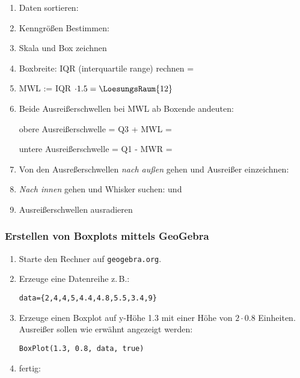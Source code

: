 \begin{enumerate}

\item Daten sortieren: 

\item Kenngrößen Bestimmen: 

\item Skala und Box zeichnen

\item Boxbreite: IQR (interquartile range) rechnen =
\item MWL := IQR $\cdot{} 1.5 = \LoesungsRaum{12}$
  
\item Beide Ausreißerschwellen bei MWL ab Boxende andeuten:

  obere Ausreißerschwelle = Q3 + MWL = 

  untere Ausreißerschwelle = Q1 - MWR = 

  \item Von den Ausreßerschwellen \textit{nach außen} gehen und
    Ausreißer einzeichnen: 

  \item \textit{Nach innen} gehen und Whisker suchen:
     und 
    
  \item Ausreißerschwellen ausradieren
\end{enumerate}





\subsubsection{Erstellen von Boxplots mittels GeoGebra}
\begin{enumerate}
\item Starte den Rechner auf \texttt{geogebra.org}.
\item Erzeuge eine Datenreihe z.\,B.:

\texttt{data=\{2,4,4,5,4.4,4.8,5.5,3.4,9\}}


\item Erzeuge einen Boxplot auf y-Höhe 1.3 mit einer Höhe von
  $2\cdot{}0.8$ Einheiten. Ausreißer sollen wie erwähnt angezeigt
  werden:

  \texttt{BoxPlot(1.3, 0.8, data, true)}

\item fertig:


  
\end{enumerate}

